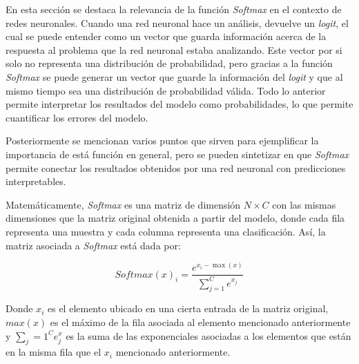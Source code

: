 \documentclass[12pt, letterpaper]{article}
\begin{document}
En esta sección se destaca la relevancia de la función \textit{Softmax} en el contexto de redes neuronales. Cuando 
una red neuronal hace un análisis, devuelve un \textit{logit}, el cual se puede entender como un vector que guarda información acerca 
de la respuesta al problema que la red neuronal estaba analizando. Este vector por si solo no representa una distribución de probabilidad, pero 
gracias a la función \textit{Softmax} se puede generar un vector que guarde la información del \textit{logit} y que al mismo tiempo sea una distribución 
de probabilidad válida. Todo lo anterior permite interpretar los resultados del modelo como probabilidades, lo que permite cuantificar los errores del modelo.

Posteriormente se mencionan varios puntos que sirven para ejemplificar la importancia de está función en general, pero se pueden sintetizar en que \textit{Softmax} permite
conectar los resultados obtenidos por una red neuronal con predicciones interpretables. 

Matemáticamente, \textit{Softmax} es una matriz de dimensión $N\times C$ con las mismas dimensiones que la matriz original obtenida a partir del modelo, donde cada fila representa una muestra y cada columna representa una clasificación. Así, la matriz asociada a \textit{Softmax} está dada por:

$$\textit{Softmax}(x)_i = \frac{e^{x_i-\max(x)}}{\sum_{j=1}^C e^{x_j}} $$

Donde $x_i$ es el elemento ubicado en una cierta entrada de la matriz original, $max(x)$ es el máximo de la fila asociada al elemento mencionado anteriormente y $\sum_j=1^C e^x_j$ es la suma de las exponenciales asociadas a los elementos que están en la misma fila que el $x_i$ mencionado anteriormente. 
\end{document}
